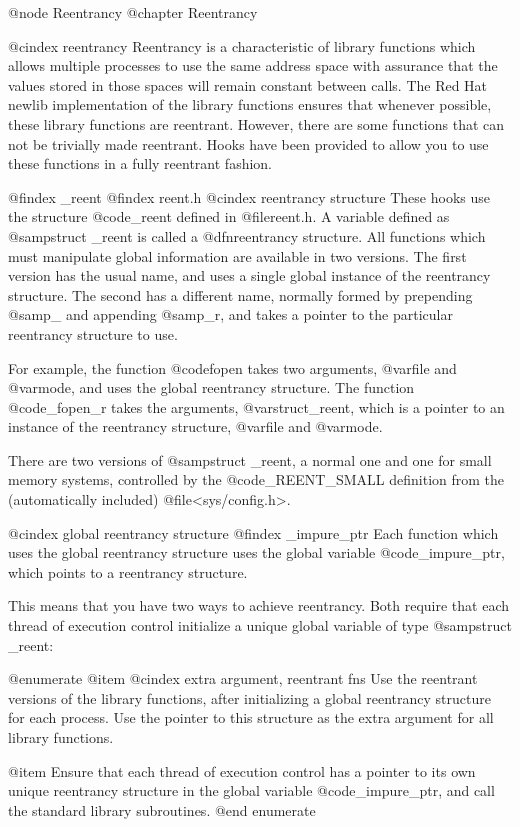 @node Reentrancy
@chapter Reentrancy

@cindex reentrancy
Reentrancy is a characteristic of library functions which allows multiple
processes to use the same address space with assurance that the values stored
in those spaces will remain constant between calls. The Red Hat
newlib implementation of the library functions ensures that 
whenever possible, these library functions are reentrant.  However,
there are some functions that can not be trivially made reentrant.
Hooks have been provided to allow you to use these functions in a fully
reentrant fashion.

@findex _reent
@findex reent.h
@cindex reentrancy structure
These hooks use the structure @code{_reent} defined in @file{reent.h}.
A variable defined as @samp{struct _reent} is called a @dfn{reentrancy structure}.
All functions which must manipulate global information are
available in two versions.  The first version has the usual name, and
uses a single global instance of the reentrancy structure.  The second
has a different name, normally formed by prepending @samp{_} and
appending @samp{_r}, and takes a pointer to the particular reentrancy
structure to use.

For example, the function @code{fopen} takes two arguments, @var{file}
and @var{mode}, and uses the global reentrancy structure.  The function
@code{_fopen_r} takes the arguments, @var{struct_reent}, which is a
pointer to an instance of the reentrancy structure, @var{file}
and @var{mode}.	

There are two versions of @samp{struct _reent}, a normal one and one
for small memory systems, controlled by the @code{_REENT_SMALL}
definition from the (automatically included) @file{<sys/config.h>}.

@cindex global reentrancy structure
@findex _impure_ptr
Each function which uses the global reentrancy structure uses the global
variable @code{_impure_ptr}, which points to a reentrancy structure.

This means that you have two ways to achieve reentrancy.  Both require
that each thread of execution control initialize a unique global
variable of type @samp{struct _reent}:

@enumerate
@item
@cindex extra argument, reentrant fns
Use the reentrant versions of the library functions, after initializing
a global reentrancy structure for each process.  Use the pointer to this
structure as the extra argument for all library functions.

@item
Ensure that each thread of execution control has a pointer to its own
unique reentrancy structure in the global variable @code{_impure_ptr},
and call the standard library subroutines.
@end enumerate

